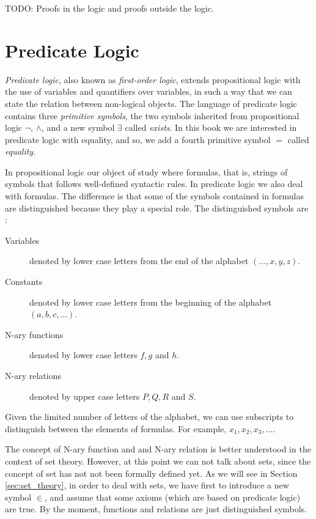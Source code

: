 {\color{red} TODO: Proofs in the logic and proofs outside the logic.}

%
%

\section{Predicate Logic}
\label{sec:predicate_logic}

\emph{Predicate logic}, also known as \emph{first-order logic}, extends propositional logic with the use of variables and quantifiers over variables, in such a way that we can state the relation between non-logical objects. The language of predicate logic contains three \emph{primitive symbols}, the two symbols inherited from propositional logic $\lnot$, $\land$, and a new symbol $\exists$ called \emph{exists}. In this book we are interested in predicate logic with equality, and so, we add a fourth primitive symbol $=$ called \emph{equality}.

In propositional logic our object of study where formulas, that is, strings of symbols that follows well-defined syntactic rules. In predicate logic we also deal with formulas. The difference is that some of the symbols contained in formulas are distinguished because they play a special role. The distinguished symbols are :

\vskip 0.25cm

\begin{description}
\item [Variables] denoted by lower case letters from the end of the alphabet $(\ldots, x, y, z)$.
\item [Constants] denoted by lower case letters from the beginning of the alphabet $(a, b, c, \ldots)$. 
\item [N-ary functions] denoted by lower case letters $f, g$ and $h$.
\item [N-ary relations] denoted by upper case letters $P, Q, R$ and $S$.
\end{description}

\vskip 0.25cm

\begin{notation}
Given the limited number of letters of the alphabet, we can use subscripts to distinguish between the elements of formulas. For example, $x_1, x_2, x_3, \ldots$.
\end{notation}

The concept of N-ary function and and N-ary relation is better understood in the context of set theory. However, at this point we can not talk about sets, since the concept of set has not not been formally defined yet. As we will see in Section \ref{sec:set_theory}, in order to deal with sets, we have first to introduce a new symbol $\in$, and assume that some axioms (which are based on predicate logic) are true. By the moment, functions and relations are just distinguished symbols.

